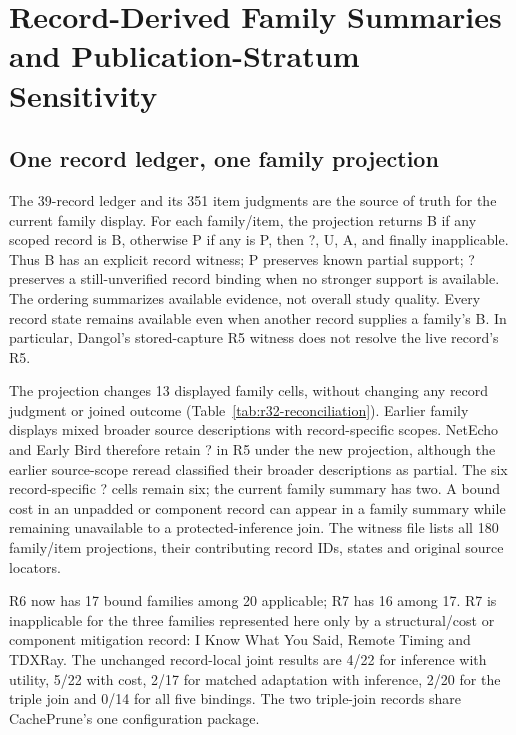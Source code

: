 \section{Record-Derived Family Summaries and Publication-Stratum Sensitivity}\label{sec:r32-reconciliation}
\subsection{One record ledger, one family projection}
The 39-record ledger and its 351 item judgments are the source of truth for the current family display. For each family/item, the projection returns B if any scoped record is B, otherwise P if any is P, then ?, U, A, and finally inapplicable. Thus B has an explicit record witness; P preserves known partial support; ? preserves a still-unverified record binding when no stronger support is available. The ordering summarizes available evidence, not overall study quality. Every record state remains available even when another record supplies a family's B. In particular, Dangol's stored-capture R5 witness does not resolve the live record's R5.

The projection changes 13 displayed family cells, without changing any record judgment or joined outcome (Table~\ref{tab:r32-reconciliation}). Earlier family displays mixed broader source descriptions with record-specific scopes. NetEcho and Early Bird therefore retain ? in R5 under the new projection, although the earlier source-scope reread classified their broader descriptions as partial. The six record-specific ? cells remain six; the current family summary has two. A bound cost in an unpadded or component record can appear in a family summary while remaining unavailable to a protected-inference join. The witness file lists all 180 family/item projections, their contributing record IDs, states and original source locators.

R6 now has 17 bound families among 20 applicable; R7 has 16 among 17. R7 is inapplicable for the three families represented here only by a structural/cost or component mitigation record: I Know What You Said, Remote Timing and TDXRay. The unchanged record-local joint results are 4/22 for inference with utility, 5/22 with cost, 2/17 for matched adaptation with inference, 2/20 for the triple join and 0/14 for all five bindings. The two triple-join records share CachePrune's one configuration package.


